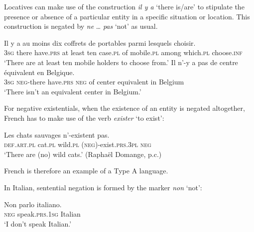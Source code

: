 \documentclass[output=paper,colorlinks,citecolor=brown]{langscibook}
\begin{document}
\begin{paperappendix}
\begin{unindented}
Locatives can make use of the construction \textit{il y a} `there is\slash are' to stipulate the presence or absence of a particular entity in a specific situation or location. This construction is negated by \textit{ne} … \textit{pas} `not' as usual.
%
\begin{exe}\ex \gll
Il y a au moins dix coffrets de portables parmi lesquels choisir. \\
\textsc{3sg} there have.\textsc{prs} at  least    ten case.\textsc{pl} of mobile.\textsc{pl} among which.\textsc{pl} choose.\textsc{inf} \\
    \glt `There are at least ten mobile holders to choose from.' \citep[274]{Offord2006}
\ex \gll Il n’-y a pas de centre équivalent en Belgique. \\
\textsc{3sg} \textsc{neg}-there have.\textsc{prs} \textsc{neg}  of center equivalent in Belgium \\
    \glt `There isn't an equivalent center in Belgium.' \citep[208]{Offord2006}
    \end{exe}

For negative existentials, when the existence of an entity is negated altogether, French has to make use of the verb \textit{exister} `to exist':
%
\begin{exe}\ex \gll Les chats sauvages {\op}n’-{\cp}existent pas. \\
\textsc{def.art.pl} cat.\textsc{pl} wild.\textsc{pl}   (\textsc{neg})-exist.\textsc{prs.3pl} \textsc{neg} \\
    \glt `There are (no) wild cats.' (Raphaël Domange, p.c.)
    \end{exe}

French is therefore an example of a Type A language. 


In Italian, sentential negation is formed by the marker \textit{non} `not':
%
\begin{exe}\ex \gll Non parlo italiano. \\
\textsc{neg} speak.\textsc{prs}.\textsc{1sg} Italian  \\
    \glt `I don't speak Italian.' \parencite[41]{PeyronelHiggins2006}
    \end{exe}


\end{unindented}
\end{paperappendix}
\end{document}
